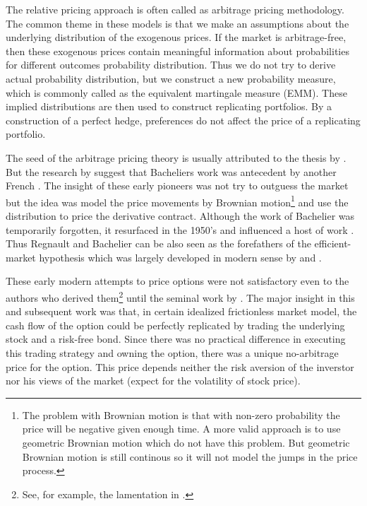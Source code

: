 The relative pricing approach is often called as arbitrage pricing methodology. The common theme in these models is that we make an assumptions about the underlying distribution of the exogenous prices. If the market is arbitrage-free, then these exogenous prices contain meaningful information about probabilities for different outcomes probability distribution. Thus we do not try to derive actual probability distribution, but we construct a new probability measure, which is commonly called as the equivalent martingale measure (EMM).  These implied distributions are then used to construct replicating portfolios. By a construction of a perfect hedge, preferences do not affect the price of a replicating portfolio. 

The seed of the arbitrage pricing theory is usually attributed to the thesis by \textcite{bachelier1900theorie}. But the research by \textcite{jovanoviclegall2001does} suggest that Bacheliers work was antecedent by another French \textcite{regnault1863calcul}. The insight of these early pioneers was not try to outguess the market but the idea was model the price movements by Brownian motion\footnote{The problem with Brownian motion is that with non-zero probability the price will be negative given enough time. A more valid approach is to use geometric Brownian motion which do not have this problem. But geometric Brownian motion is still continous so it will not model the jumps in the price process.} and use the distribution to price the derivative contract. Although the work of Bachelier was temporarily forgotten, it resurfaced in the 1950's and influenced a host of work \parencite{samuelson1973mathematics}. Thus Regnault and Bachelier can be also seen as the forefathers of the efficient-market hypothesis which was largely developed in modern sense by \textcite{fama1965behavior} and \textcite{samuelson1965proof}.

These early modern attempts to price options were not satisfactory even to the authors who derived them\footnote{See, for example, the lamentation in \textcite{samuelson1965rational}.} until the seminal work by \textcite{blackscholes1973pricing}. The major insight in this and subsequent work was that, in certain idealized frictionless market model, the cash flow of the option could be perfectly replicated by trading the underlying stock and a risk-free bond. Since there was no practical difference in executing this trading strategy and owning the option, there was a unique no-arbitrage price for the option. This price depends neither the risk aversion of the inverstor nor his views of the market (expect for the volatility of stock price).

